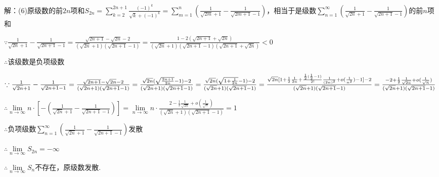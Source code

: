 \documentclass[12pt,UTF8]{ctexart}
\begin{document}
\begin{enumerate}
解：(6)原级数的前$2n$项和$S_{2n}=\sum_{k=2}^{2n+1}\frac{(-1)^k}{\sqrt k+(-1)^k}=\sum_{m=1}^n(\frac1{\sqrt{2m}+1}-\frac1{\sqrt{2m+1}-1})$，相当于是级数$\sum_{n=1}^\infty(\frac1{\sqrt{2n}+1}-\frac1{\sqrt{2n+1}-1})$的前$n$项和

$\because\frac1{\sqrt{2n}+1}-\frac1{\sqrt{2n+1}-1}=\frac{\sqrt{2n+1}-\sqrt{2n}-2}{(\sqrt{2n}+1)(\sqrt{2n+1}-1)}=\frac{1-2(\sqrt{2n+1}+\sqrt{2n})}{(\sqrt{2n}+1)(\sqrt{2n+1}-1)(\sqrt{2n+1}+\sqrt{2n})}<0$

$\therefore$该级数是负项级数

$\because\frac1{\sqrt{2n}+1}-\frac1{\sqrt{2n+1}-1}=\frac{\sqrt{2n+1}-\sqrt{2n}-2}{(\sqrt{2n}+1)(\sqrt{2n+1}-1)}=\frac{\sqrt{2n}(\sqrt{\frac{2n+1}{2n}}-1)-2}{(\sqrt{2n}+1)(\sqrt{2n+1}-1)}=\frac{\sqrt{2n}(\sqrt{1+\frac1{2n}}-1)-2}{(\sqrt{2n}+1)(\sqrt{2n+1}-1)}\\
=\frac{\sqrt{2n}[1+\frac12\frac1{2n}+\frac{\frac12(\frac12-1)}{2!}\frac1{(2n)^2}+o(\frac1{n^2})-1]-2}{(\sqrt{2n}+1)(\sqrt{2n+1}-1)}=\frac{-2+\frac12\frac1{\sqrt{2n}}+o(\frac1{\sqrt n})}{(\sqrt{2n}+1)(\sqrt{2n+1}-1)}$


$\therefore\lim\limits_{n\rightarrow\infty}n\cdot[-(\frac1{\sqrt{2n}+1}-\frac1{\sqrt{2n+1}-1})]=\lim\limits_{n\rightarrow\infty}n\cdot\frac{2-\frac12\frac1{\sqrt{2n}}+o(\frac1{\sqrt n})}{(\sqrt{2n}+1)(\sqrt{2n+1}-1)}=1$

$\therefore$负项级数$\sum_{n=1}^\infty(\frac1{\sqrt{2n}+1}-\frac1{\sqrt{2n+1}-1})$发散

$\therefore\lim\limits_{n\rightarrow\infty}S_{2n}=-\infty$

$\therefore\lim\limits_{n\rightarrow\infty}S_n$不存在，原级数发散.
\end{enumerate}
\end{document}
